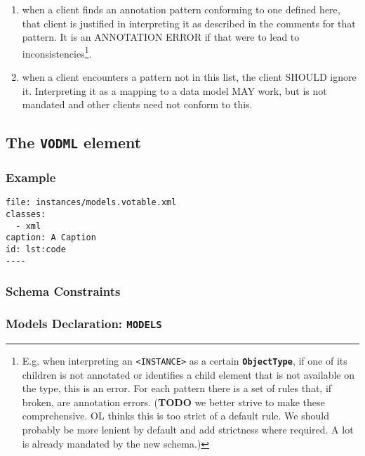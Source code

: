 \documentclass[11pt,a4paper]{ivoa}
\begin{document}
\begin{enumerate}
\def\labelenumi{\arabic{enumi}.}
\itemsep1pt\parskip0pt
\item
  when a client finds an annotation pattern conforming to one defined
  here, that client is justified in interpreting it as described in the
  comments for that pattern. It is an ANNOTATION ERROR if that were to
  lead to inconsistencies\footnote{E.g. when interpreting an
    \texttt{\textless{}INSTANCE\textgreater{}} as a certain
    \textbf{\texttt{ObjectType}}, if one of its children is not
    annotated or identifies a child element that is not available on the
    type, this is an error. For each pattern there is a set of rules
    that, if broken, are annotation errors. (\textbf{TODO} we better
    strive to make these comprehensive. OL thinks this is too strict of
    a default rule. We should probably be more lenient by default and
    add strictness where required. A lot is already mandated by the new
    schema.)}.
\item
  when a client encounters a pattern not in this list, the client SHOULD
  ignore it. Interpreting it as a mapping to a data model MAY work, but
  is not mandated and other clients need not conform to this.
\end{enumerate}

\subsection{The \texttt{VODML} element}\label{sec:norm-vodml}

\subsubsection{Example}\label{example}

\begin{verbatim}
file: instances/models.votable.xml
classes:
  - xml
caption: A Caption
id: lst:code
----
\end{verbatim}

\subsubsection{Schema Constraints}\label{schema-constraints}

\subsubsection{Models Declaration:
\texttt{MODELS}}\label{models-declaration-models}
\end{document}
